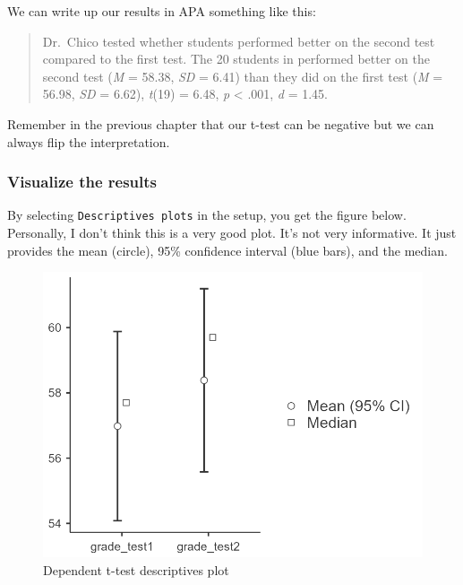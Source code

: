 \documentclass[
]{book}
\begin{document}
We can write up our results in APA something like this:

\begin{quote}
Dr.~Chico tested whether students performed better on the second test compared to the first test. The 20 students in performed better on the second test (\emph{M} = 58.38, \emph{SD} = 6.41) than they did on the first test (\emph{M} = 56.98, \emph{SD} = 6.62), \emph{t}(19) = 6.48, \emph{p} \textless{} .001, \emph{d} = 1.45.
\end{quote}

Remember in the previous chapter that our t-test can be negative but we can always flip the interpretation.

\hypertarget{visualize-the-results-2}{%
\subsubsection{Visualize the results}\label{visualize-the-results-2}}

By selecting \texttt{Descriptives\ plots} in the setup, you get the figure below. Personally, I don't think this is a very good plot. It's not very informative. It just provides the mean (circle), 95\% confidence interval (blue bars), and the median.

\begin{figure}

{\centering \includegraphics[width=1\linewidth]{images/03_dependent_t-test/dependent_results_plot} 

}

\caption{Dependent t-test descriptives plot}\label{fig:unnamed-chunk-8}
\end{figure}
\end{document}
